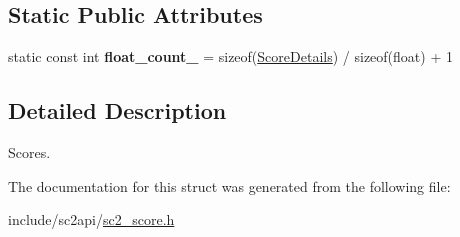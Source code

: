 \subsection*{Static Public Attributes}
\begin{DoxyCompactItemize}
\item 
\mbox{\label{structsc2_1_1_score_aa4a528eb06bd12bb51ad73d98065adf2}} 
static const int {\bfseries float\+\_\+count\+\_\+} = sizeof(\hyperlink{structsc2_1_1_score_details}{Score\+Details}) / sizeof(float) + 1
\end{DoxyCompactItemize}


\subsection{Detailed Description}
Scores. 

The documentation for this struct was generated from the following file\+:\begin{DoxyCompactItemize}
\item 
include/sc2api/\hyperlink{sc2__score_8h}{sc2\+\_\+score.\+h}\end{DoxyCompactItemize}
